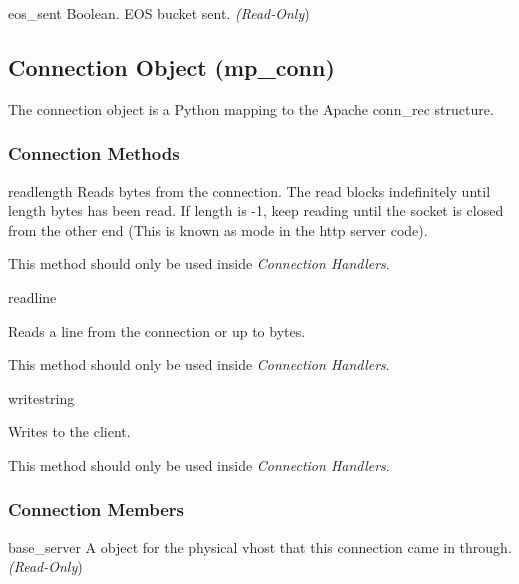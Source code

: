 \begin{memberdesc}[request]{eos_sent}
Boolean. EOS bucket sent.
\emph{(Read-Only})
\end{memberdesc}

\subsection{Connection Object (mp_conn)\label{pyapi-mpconn}}

The connection object is a Python mapping to the Apache conn_rec
structure.

\subsubsection{Connection Methods\label{pyapi-mpconn-meth}}

\begin{methoddesc}[connection]{read}{length}
Reads  bytes from the connection. The read blocks
indefinitely until length bytes has been read. If length is -1, keep
reading until the socket is closed from the other end (This is known
as  mode in the http server code).

This method should only be used inside \emph{Connection Handlers}.

\end{methoddesc}

\begin{methoddesc}[connection]{readline}{}

Reads a line from the connection or up to  bytes.

This method should only be used inside \emph{Connection Handlers}.

\end{methoddesc}

\begin{methoddesc}[connection]{write}{string}

Writes  to the client.

This method should only be used inside \emph{Connection Handlers}.

\end{methoddesc}

\subsubsection{Connection Members\label{pyapi-mpconn-mem}}

\begin{memberdesc}[connection]{base_server}
A  object for the physical vhost that this connection came in
through.
\emph{(Read-Only})
\end{memberdesc}

